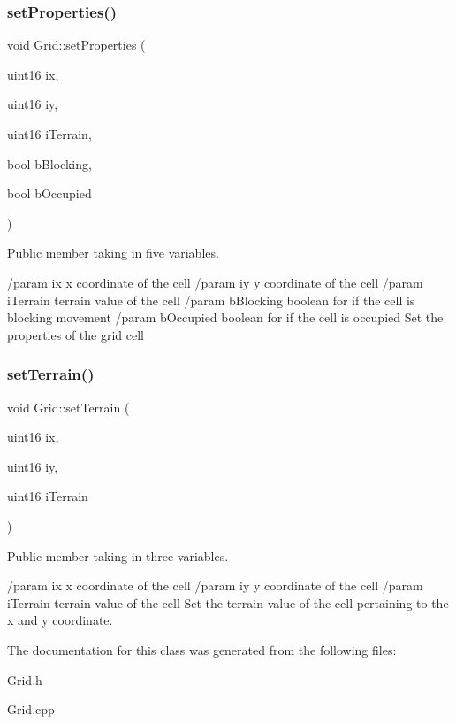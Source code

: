 \subsubsection{\texorpdfstring{set\+Properties()}{setProperties()}}
{\footnotesize\ttfamily void Grid\+::set\+Properties (\begin{DoxyParamCaption}\item[{uint16}]{ix,  }\item[{uint16}]{iy,  }\item[{uint16}]{i\+Terrain,  }\item[{bool}]{b\+Blocking,  }\item[{bool}]{b\+Occupied }\end{DoxyParamCaption})}



Public member taking in five variables. 

/param ix x coordinate of the cell /param iy y coordinate of the cell /param i\+Terrain terrain value of the cell /param b\+Blocking boolean for if the cell is blocking movement /param b\+Occupied boolean for if the cell is occupied Set the properties of the grid cell \hypertarget{class_grid_a3feb00999e05825bbb470bdc098e05ab}{}\label{class_grid_a3feb00999e05825bbb470bdc098e05ab} 
\subsubsection{\texorpdfstring{set\+Terrain()}{setTerrain()}}
{\footnotesize\ttfamily void Grid\+::set\+Terrain (\begin{DoxyParamCaption}\item[{uint16}]{ix,  }\item[{uint16}]{iy,  }\item[{uint16}]{i\+Terrain }\end{DoxyParamCaption})}



Public member taking in three variables. 

/param ix x coordinate of the cell /param iy y coordinate of the cell /param i\+Terrain terrain value of the cell Set the terrain value of the cell pertaining to the x and y coordinate. 

The documentation for this class was generated from the following files\+:\begin{DoxyCompactItemize}
\item 
Grid.\+h\item 
Grid.\+cpp\end{DoxyCompactItemize}
